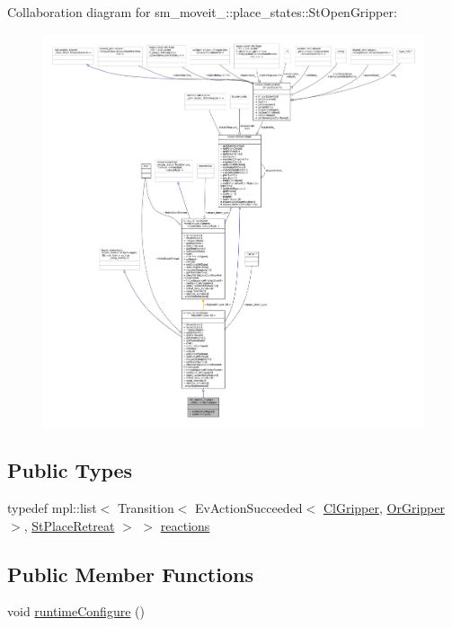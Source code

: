 Collaboration diagram for sm\+\_\+moveit\+\_\+:\+:place\+\_\+states\+:\+:St\+Open\+Gripper\+:
\nopagebreak
\begin{figure}[H]
\begin{center}
\leavevmode
\includegraphics[width=350pt]{structsm__moveit__3_1_1place__states_1_1StOpenGripper__coll__graph}
\end{center}
\end{figure}
\subsection*{Public Types}
\begin{DoxyCompactItemize}
\item 
typedef mpl\+::list$<$ Transition$<$ Ev\+Action\+Succeeded$<$ \hyperlink{classsm__moveit__3_1_1cl__gripper_1_1ClGripper}{Cl\+Gripper}, \hyperlink{classsm__moveit__3_1_1OrGripper}{Or\+Gripper} $>$, \hyperlink{structsm__moveit__3_1_1place__states_1_1StPlaceRetreat}{St\+Place\+Retreat} $>$ $>$ \hyperlink{structsm__moveit__3_1_1place__states_1_1StOpenGripper_affe526fb40b1571ca8e2285c0a078047}{reactions}
\end{DoxyCompactItemize}
\subsection*{Public Member Functions}
\begin{DoxyCompactItemize}
\item 
void \hyperlink{structsm__moveit__3_1_1place__states_1_1StOpenGripper_a2390d5b415dd3b7e2c57f68597ea9838}{runtime\+Configure} ()
\end{DoxyCompactItemize}
